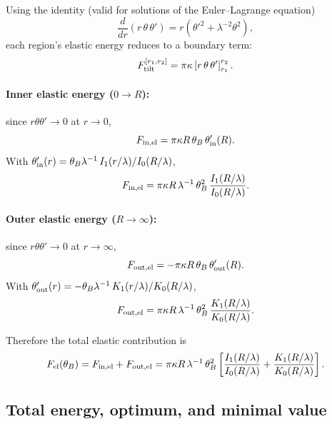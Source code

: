 \documentclass[11pt]{article}
\begin{document}
Using the identity (valid for solutions of the Euler--Lagrange equation)
\begin{equation}
\frac{d}{dr}\left(r\,\theta\,\theta'\right)
=
r\left(\theta'^2+\lambda^{-2}\theta^2\right),
\end{equation}
each region's elastic energy reduces to a boundary term:
\begin{equation}
F_{\rm tilt}^{[r_1,r_2]}
=
\pi\kappa\left[r\,\theta\,\theta'\right]_{r_1}^{r_2}.
\end{equation}

\paragraph{Inner elastic energy ($0\to R$):}
since $r\theta\theta'\to 0$ at $r\to 0$,
\begin{equation}
F_{\rm in,el}
=
\pi\kappa R\,\theta_B\,\theta'_{\rm in}(R).
\end{equation}
With $\theta'_{\rm in}(r)=\theta_B\lambda^{-1}\,I_1(r/\lambda)/I_0(R/\lambda)$,
\begin{equation}
F_{\rm in,el}
=
\pi\kappa R\,\lambda^{-1}\,\theta_B^2\,
\frac{I_1(R/\lambda)}{I_0(R/\lambda)}.
\end{equation}

\paragraph{Outer elastic energy ($R\to\infty$):}
since $r\theta\theta'\to 0$ at $r\to\infty$,
\begin{equation}
F_{\rm out,el}
=
-\pi\kappa R\,\theta_B\,\theta'_{\rm out}(R).
\end{equation}
With $\theta'_{\rm out}(r)= -\theta_B\lambda^{-1}\,K_1(r/\lambda)/K_0(R/\lambda)$,
\begin{equation}
F_{\rm out,el}
=
\pi\kappa R\,\lambda^{-1}\,\theta_B^2\,
\frac{K_1(R/\lambda)}{K_0(R/\lambda)}.
\end{equation}

Therefore the total elastic contribution is
\begin{equation}
F_{\rm el}(\theta_B)
=
F_{\rm in,el}+F_{\rm out,el}
=
\pi\kappa R\,\lambda^{-1}\,\theta_B^2
\left[
\frac{I_1(R/\lambda)}{I_0(R/\lambda)}
+
\frac{K_1(R/\lambda)}{K_0(R/\lambda)}
\right].
\end{equation}

\subsection{Total energy, optimum, and minimal value}
\end{document}
